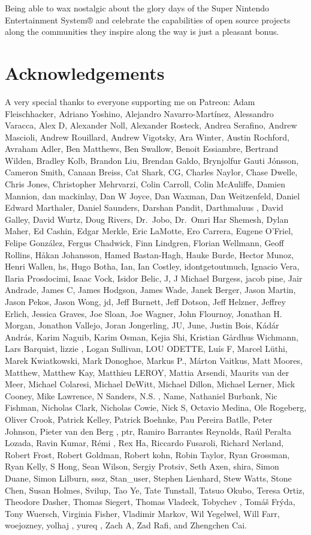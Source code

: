 \documentclass[
  letterpaper,
  DIV=11,
  numbers=noendperiod]{scrartcl}
\begin{document}
Being able to wax nostalgic about the glory days of the Super Nintendo
Entertainment System® and celebrate the capabilities of open source
projects along the communities they inspire along the way is just a
pleasant bonus.

\section*{Acknowledgements}\label{acknowledgements}

A very special thanks to everyone supporting me on Patreon: Adam
Fleischhacker, Adriano Yoshino, Alejandro Navarro-Martínez, Alessandro
Varacca, Alex D, Alexander Noll, Alexander Rosteck, Andrea Serafino,
Andrew Mascioli, Andrew Rouillard, Andrew Vigotsky, Ara Winter, Austin
Rochford, Avraham Adler, Ben Matthews, Ben Swallow, Benoit Essiambre,
Bertrand Wilden, Bradley Kolb, Brandon Liu, Brendan Galdo, Brynjolfur
Gauti Jónsson, Cameron Smith, Canaan Breiss, Cat Shark, CG, Charles
Naylor, Chase Dwelle, Chris Jones, Christopher Mehrvarzi, Colin Carroll,
Colin McAuliffe, Damien Mannion, dan mackinlay, Dan W Joyce, Dan Waxman,
Dan Weitzenfeld, Daniel Edward Marthaler, Daniel Saunders, Darshan
Pandit, Darthmaluus , David Galley, David Wurtz, Doug Rivers, Dr.~Jobo,
Dr.~Omri Har Shemesh, Dylan Maher, Ed Cashin, Edgar Merkle, Eric
LaMotte, Ero Carrera, Eugene O'Friel, Felipe González, Fergus Chadwick,
Finn Lindgren, Florian Wellmann, Geoff Rollins, Håkan Johansson, Hamed
Bastan-Hagh, Hauke Burde, Hector Munoz, Henri Wallen, hs, Hugo Botha,
Ian, Ian Costley, idontgetoutmuch, Ignacio Vera, Ilaria Prosdocimi,
Isaac Vock, Isidor Belic, J, J Michael Burgess, jacob pine, Jair
Andrade, James C, James Hodgson, James Wade, Janek Berger, Jason Martin,
Jason Pekos, Jason Wong, jd, Jeff Burnett, Jeff Dotson, Jeff Helzner,
Jeffrey Erlich, Jessica Graves, Joe Sloan, Joe Wagner, John Flournoy,
Jonathan H. Morgan, Jonathon Vallejo, Joran Jongerling, JU, June, Justin
Bois, Kádár András, Karim Naguib, Karim Osman, Kejia Shi, Kristian
Gårdhus Wichmann, Lars Barquist, lizzie , Logan Sullivan, LOU ODETTE,
Luís F, Marcel Lüthi, Marek Kwiatkowski, Mark Donoghoe, Markus P.,
Márton Vaitkus, Matt Moores, Matthew, Matthew Kay, Matthieu LEROY,
Mattia Arsendi, Maurits van der Meer, Michael Colaresi, Michael DeWitt,
Michael Dillon, Michael Lerner, Mick Cooney, Mike Lawrence, N Sanders,
N.S. , Name, Nathaniel Burbank, Nic Fishman, Nicholas Clark, Nicholas
Cowie, Nick S, Octavio Medina, Ole Rogeberg, Oliver Crook, Patrick
Kelley, Patrick Boehnke, Pau Pereira Batlle, Peter Johnson, Pieter van
den Berg , ptr, Ramiro Barrantes Reynolds, Raúl Peralta Lozada, Ravin
Kumar, Rémi , Rex Ha, Riccardo Fusaroli, Richard Nerland, Robert Frost,
Robert Goldman, Robert kohn, Robin Taylor, Ryan Grossman, Ryan Kelly, S
Hong, Sean Wilson, Sergiy Protsiv, Seth Axen, shira, Simon Duane, Simon
Lilburn, sssz, Stan\_user, Stephen Lienhard, Stew Watts, Stone Chen,
Susan Holmes, Svilup, Tao Ye, Tate Tunstall, Tatsuo Okubo, Teresa Ortiz,
Theodore Dasher, Thomas Siegert, Thomas Vladeck, Tobychev , Tomáš Frýda,
Tony Wuersch, Virginia Fisher, Vladimir Markov, Wil Yegelwel, Will Farr,
woejozney, yolhaj , yureq , Zach A, Zad Rafi, and Zhengchen Cai.
\end{document}
